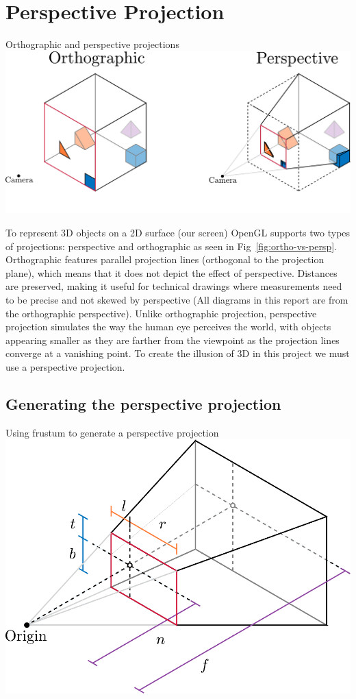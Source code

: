 \section{Perspective Projection}

\begin{figureBox}[label={fig:ortho-vs-persp}, width=0.8\linewidth]{Orthographic and perspective projections}
    \includegraphics[width = 0.8\linewidth]{./background/figures/projection/ortho-vs-persp.pdf}
\end{figureBox}

To represent 3D objects on a 2D surface (our screen) OpenGL supports two types of projections: perspective and orthographic as seen in Fig~\ref{fig:ortho-vs-persp}. Orthographic features parallel projection lines (orthogonal to the projection plane), which means that it does not depict the effect of perspective. Distances are preserved, making it useful for technical drawings where measurements need to be precise and not skewed by perspective (All diagrams in this report are from the orthographic perspective). Unlike orthographic projection, perspective projection simulates the way the human eye perceives the world, with objects appearing smaller as they are farther from the viewpoint as the projection lines converge at a vanishing point. To create the illusion of 3D in this project we must use a perspective projection.

\subsection{Generating the perspective projection}

\begin{figureBox}[label={fig:persp-projection}, width=0.8\linewidth]{Using frustum to generate a perspective projection}
    \includegraphics[width = 0.8\linewidth]{./background/figures/projection/persp-projection.pdf}
\end{figureBox}


